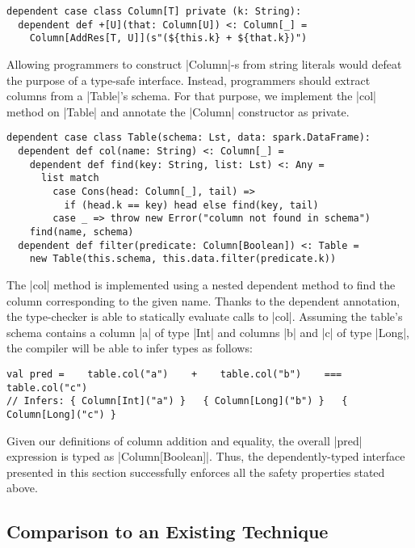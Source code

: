 \begin{lstlisting}
dependent case class Column[T] private (k: String):
  dependent def +[U](that: Column[U]) <: Column[_] =
    Column[AddRes[T, U]](s"(${this.k} + ${that.k})")
\end{lstlisting}

Allowing programmers to construct |Column|-s from string literals would defeat the purpose of a type-safe interface.
Instead, programmers should extract columns from a |Table|'s schema.
For that purpose, we implement the |col| method on |Table| and annotate the |Column| constructor as private.

\begin{lstlisting}
dependent case class Table(schema: Lst, data: spark.DataFrame):
  dependent def col(name: String) <: Column[_] =
    dependent def find(key: String, list: Lst) <: Any =
      list match
        case Cons(head: Column[_], tail) =>
          if (head.k == key) head else find(key, tail)
        case _ => throw new Error("column not found in schema")
    find(name, schema)
  dependent def filter(predicate: Column[Boolean]) <: Table =
    new Table(this.schema, this.data.filter(predicate.k))
\end{lstlisting}

The |col| method is implemented using a nested dependent method to find the column corresponding to the given name.
Thanks to the dependent annotation, the type-checker is able to statically evaluate calls to |col|.
Assuming the table's schema contains a column |a| of type |Int| and columns |b| and |c| of type |Long|, the compiler will be able to infer types as follows:

\begin{lstlisting}
val pred =    table.col("a")    +    table.col("b")    ===   table.col("c")
// Infers: { Column[Int]("a") }   { Column[Long]("b") }   { Column[Long]("c") }
\end{lstlisting}

\noindent
Given our definitions of column addition and equality, the overall |pred| expression is typed as |Column[Boolean]|.
Thus, the dependently-typed interface presented in this section successfully enforces all the safety properties stated above.

\subsection{Comparison to an Existing Technique}


